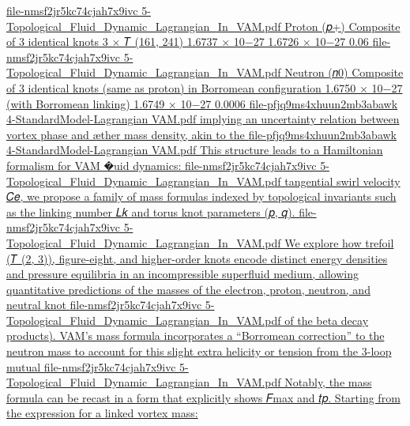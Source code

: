 {}\href{file://file-nmsf2jr5kc74cjah7x9ivc%23:~:text=proton%20,06/}{file-nmsf2jr5kc74cjah7x9ivc
5-Topological_Fluid_Dynamic_Lagrangian_In_VAM.pdf
Proton (𝑝+) Composite of 3 identical knots 3 × 𝑇 (161, 241) 1.6737 × 10−27 1.6726 × 10−27 0.06%
}\href{file://file-nmsf2jr5kc74cjah7x9ivc%23:~:text=neutron%20,0006/}{file-nmsf2jr5kc74cjah7x9ivc
5-Topological_Fluid_Dynamic_Lagrangian_In_VAM.pdf
Neutron (𝑛0) Composite of 3 identical knots (same as proton) in Borromean configuration 1.6750 × 10−27 (with Borromean linking) 1.6749 × 10−27 0.0006%
}\href{file://file-pfjq9ms4xhuun2mb3abawk%23:~:text=implying%20an%20uncertainty%20relation%20between,mass%20density,%20akin%20to%20the/}{file-pfjq9ms4xhuun2mb3abawk
4-StandardModel-Lagrangian VAM.pdf
implying an uncertainty relation between vortex phase and æther mass density, akin to the
}\href{file://file-pfjq9ms4xhuun2mb3abawk%23:~:text=this%20structure%20leads%20to%20a,formalism%20for%20vam%20%EF%BF%BDuid%20dynamics/}{file-pfjq9ms4xhuun2mb3abawk
4-StandardModel-Lagrangian VAM.pdf
This structure leads to a Hamiltonian formalism for VAM �uid dynamics:
}\href{file://file-nmsf2jr5kc74cjah7x9ivc%23:~:text=tangential%20swirl%20velocity%20ce,%20we,p,%20q/}{file-nmsf2jr5kc74cjah7x9ivc
5-Topological_Fluid_Dynamic_Lagrangian_In_VAM.pdf
tangential swirl velocity 𝐶𝑒, we propose a family of mass formulas indexed by topological invariants such as the linking number 𝐿𝑘 and torus knot parameters (𝑝, 𝑞).
}\href{file://file-nmsf2jr5kc74cjah7x9ivc%23:~:text=we%20explore%20how%20trefoil%20,proton,%20neutron,%20and%20neutral%20knot/}{file-nmsf2jr5kc74cjah7x9ivc
5-Topological_Fluid_Dynamic_Lagrangian_In_VAM.pdf
We explore how trefoil (𝑇 (2, 3)), figure-eight, and higher-order knots encode distinct energy densities and pressure equilibria in an incompressible superfluid medium, allowing quantitative predictions of the masses of the electron, proton, neutron, and neutral knot
}\href{file://file-nmsf2jr5kc74cjah7x9ivc%23:~:text=of%20the%20beta%20decay%20products),loop%20mutual/}{file-nmsf2jr5kc74cjah7x9ivc
5-Topological_Fluid_Dynamic_Lagrangian_In_VAM.pdf
of the beta decay products). VAM’s mass formula incorporates a “Borromean correction” to the neutron mass to account for this slight extra helicity or tension from the 3-loop mutual
}\href{file://file-nmsf2jr5kc74cjah7x9ivc%23:~:text=notably,%20the%20mass%20formula%20can,for%20a%20linked%20vortex%20mass/}{file-nmsf2jr5kc74cjah7x9ivc
5-Topological_Fluid_Dynamic_Lagrangian_In_VAM.pdf
Notably, the mass formula can be recast in a form that explicitly shows 𝐹max and 𝑡𝑝. Starting from the expression for a linked vortex mass:
}